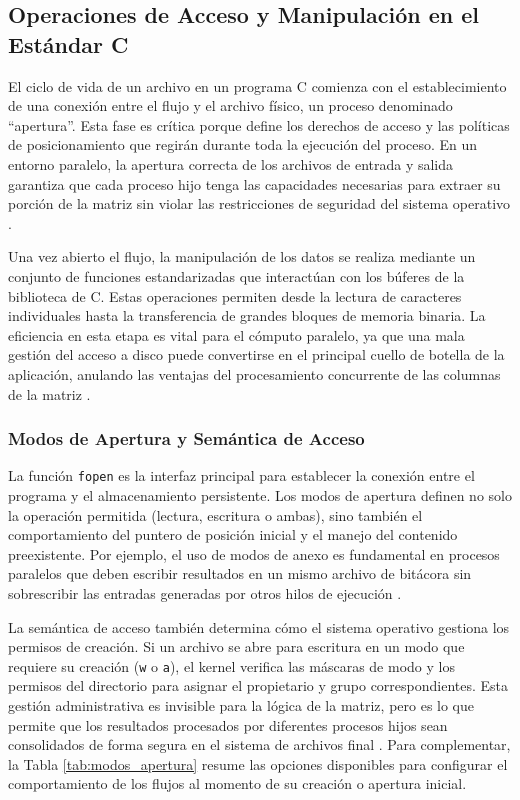 \subsection{Operaciones de Acceso y Manipulación en el Estándar C}

El ciclo de vida de un archivo en un programa C comienza con el establecimiento de una conexión entre el flujo y el archivo físico, un proceso denominado \enquote{apertura}. Esta fase es crítica porque define los derechos de acceso y las políticas de posicionamiento que regirán durante toda la ejecución del proceso. En un entorno paralelo, la apertura correcta de los archivos de entrada y salida garantiza que cada proceso hijo tenga las capacidades necesarias para extraer su porción de la matriz sin violar las restricciones de seguridad del sistema operativo \cite{glibc_manual}.

Una vez abierto el flujo, la manipulación de los datos se realiza mediante un conjunto de funciones estandarizadas que interactúan con los búferes de la biblioteca de C. Estas operaciones permiten desde la lectura de caracteres individuales hasta la transferencia de grandes bloques de memoria binaria. La eficiencia en esta etapa es vital para el cómputo paralelo, ya que una mala gestión del acceso a disco puede convertirse en el principal cuello de botella de la aplicación, anulando las ventajas del procesamiento concurrente de las columnas de la matriz \cite{glibc_manual, iso2024c}.

\subsubsection{Modos de Apertura y Semántica de Acceso}

La función \texttt{fopen} es la interfaz principal para establecer la conexión entre el programa y el almacenamiento persistente. Los modos de apertura definen no solo la operación permitida (lectura, escritura o ambas), sino también el comportamiento del puntero de posición inicial y el manejo del contenido preexistente. Por ejemplo, el uso de modos de anexo es fundamental en procesos paralelos que deben escribir resultados en un mismo archivo de bitácora sin sobrescribir las entradas generadas por otros hilos de ejecución \cite{iso2024c, glibc_manual}.

La semántica de acceso también determina cómo el sistema operativo gestiona los permisos de creación. Si un archivo se abre para escritura en un modo que requiere su creación (\texttt{w} o \texttt{a}), el kernel verifica las máscaras de modo y los permisos del directorio para asignar el propietario y grupo correspondientes. Esta gestión administrativa es invisible para la lógica de la matriz, pero es lo que permite que los resultados procesados por diferentes procesos hijos sean consolidados de forma segura en el sistema de archivos final \cite{glibc_manual, linux_man}. Para complementar, la Tabla \ref{tab:modos_apertura} resume las opciones disponibles para configurar el comportamiento de los flujos al momento de su creación o apertura inicial.

